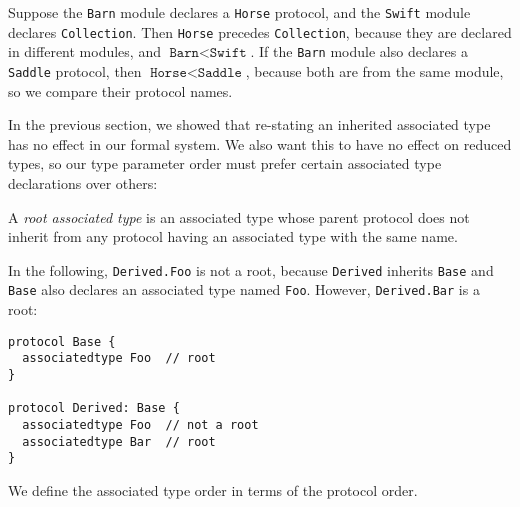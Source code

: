 \documentclass[../generics]{subfiles}
\begin{document}
Suppose the \texttt{Barn} module declares a \texttt{Horse} protocol, and the \texttt{Swift} module declares \texttt{Collection}. Then \texttt{Horse} precedes \texttt{Collection}, because they are declared in different modules, and $\texttt{Barn}<\texttt{Swift}$. If the \texttt{Barn} module also declares a \texttt{Saddle} protocol, then $\texttt{Horse}<\texttt{Saddle}$, because both are from the same module, so we compare their protocol names.

In the previous section, we showed that re-stating an inherited associated type has no effect in our formal system. We also want this to have no effect on reduced types, so our type parameter order must prefer certain associated type declarations over others:

\begin{definition}\label{root associated type} A \emph{root associated type} is an associated type whose parent protocol does not inherit from any protocol having an associated type with the same name.
\end{definition}

In the following, \texttt{Derived.Foo} is not a root, because \texttt{Derived} inherits \texttt{Base} and \texttt{Base} also declares an associated type named \texttt{Foo}. However, \texttt{Derived.Bar} is a root:
\begin{Verbatim}
protocol Base {
  associatedtype Foo  // root
}

protocol Derived: Base {
  associatedtype Foo  // not a root
  associatedtype Bar  // root
}
\end{Verbatim}

We define the associated type order in terms of the protocol order.
\end{document}
